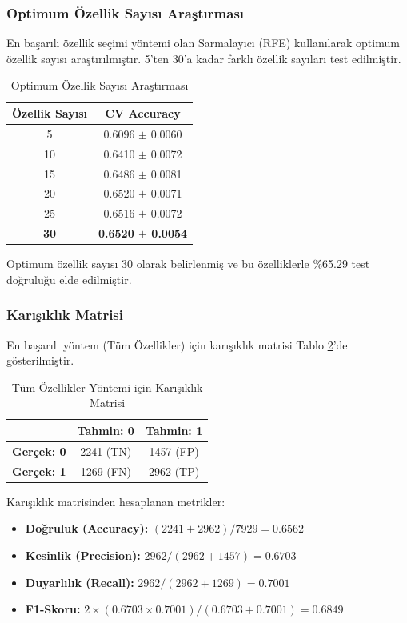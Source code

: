 \documentclass[conference]{IEEEtran}
\begin{document}
\subsubsection{Optimum Özellik Sayısı Araştırması}

En başarılı özellik seçimi yöntemi olan Sarmalayıcı (RFE) kullanılarak optimum özellik sayısı araştırılmıştır. 5'ten 30'a kadar farklı özellik sayıları test edilmiştir.

\begin{table}[H]
\centering
\caption{Optimum Özellik Sayısı Araştırması}
\label{tab:optimal_search}
\begin{tabular}{cc}
\toprule
\textbf{Özellik Sayısı} & \textbf{CV Accuracy} \\
\midrule
5 & 0.6096 $\pm$ 0.0060 \\
10 & 0.6410 $\pm$ 0.0072 \\
15 & 0.6486 $\pm$ 0.0081 \\
20 & 0.6520 $\pm$ 0.0071 \\
25 & 0.6516 $\pm$ 0.0072 \\
\textbf{30} & \textbf{0.6520 $\pm$ 0.0054} \\
\bottomrule
\end{tabular}
\end{table}

Optimum özellik sayısı 30 olarak belirlenmiş ve bu özelliklerle \%65.29 test doğruluğu elde edilmiştir.

\subsubsection{Karışıklık Matrisi}

En başarılı yöntem (Tüm Özellikler) için karışıklık matrisi Tablo \ref{tab:confusion}'de gösterilmiştir.

\begin{table}[H]
\centering
\caption{Tüm Özellikler Yöntemi için Karışıklık Matrisi}
\label{tab:confusion}
\begin{tabular}{lcc}
\toprule
& \textbf{Tahmin: 0} & \textbf{Tahmin: 1} \\
\midrule
\textbf{Gerçek: 0} & 2241 (TN) & 1457 (FP) \\
\textbf{Gerçek: 1} & 1269 (FN) & 2962 (TP) \\
\bottomrule
\end{tabular}
\end{table}

Karışıklık matrisinden hesaplanan metrikler:
\begin{itemize}
    \item \textbf{Doğruluk (Accuracy):} $(2241 + 2962) / 7929 = 0.6562$
    \item \textbf{Kesinlik (Precision):} $2962 / (2962 + 1457) = 0.6703$
    \item \textbf{Duyarlılık (Recall):} $2962 / (2962 + 1269) = 0.7001$
    \item \textbf{F1-Skoru:} $2 \times (0.6703 \times 0.7001) / (0.6703 + 0.7001) = 0.6849$
\end{itemize}
\end{document}
